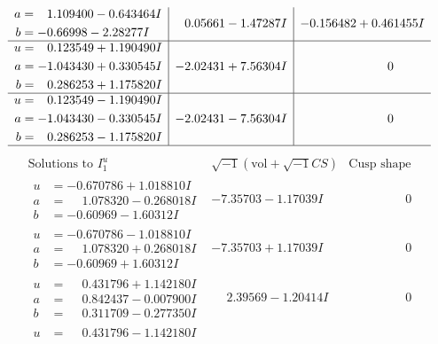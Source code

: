 \documentclass[1p]{elsarticle_modified}
\theoremstyle{definition}
\newcommand{\I}{\sqrt{-1}}
\begin{document}
$$\begin{array}{c|c|c}
\begin{aligned}
a &= \phantom{-}1.109400 - 0.643464 I \\
b &= -0.66998 - 2.28277 I\end{aligned}
 & \phantom{-}0.05661 - 1.47287 I & -0.156482 + 0.461455 I \\ \hline\begin{aligned}
u &= \phantom{-}0.123549 + 1.190490 I \\
a &= -1.043430 + 0.330545 I \\
b &= \phantom{-}0.286253 + 1.175820 I\end{aligned}
 & -2.02431 + 7.56304 I & \phantom{-0.000000 } 0 \\ \hline\begin{aligned}
u &= \phantom{-}0.123549 - 1.190490 I \\
a &= -1.043430 - 0.330545 I \\
b &= \phantom{-}0.286253 - 1.175820 I\end{aligned}
 & -2.02431 - 7.56304 I & \phantom{-0.000000 } 0\\
 \hline 
 \end{array}$$\newpage$$\begin{array}{c|c|c}  
\text{Solutions to }I^u_{1}& \I (\text{vol} + \sqrt{-1}CS) & \text{Cusp shape}\\
 \hline 
\begin{aligned}
u &= -0.670786 + 1.018810 I \\
a &= \phantom{-}1.078320 - 0.268018 I \\
b &= -0.60969 - 1.60312 I\end{aligned}
 & -7.35703 - 1.17039 I & \phantom{-0.000000 } 0 \\ \hline\begin{aligned}
u &= -0.670786 - 1.018810 I \\
a &= \phantom{-}1.078320 + 0.268018 I \\
b &= -0.60969 + 1.60312 I\end{aligned}
 & -7.35703 + 1.17039 I & \phantom{-0.000000 } 0 \\ \hline\begin{aligned}
u &= \phantom{-}0.431796 + 1.142180 I \\
a &= \phantom{-}0.842437 - 0.007900 I \\
b &= \phantom{-}0.311709 - 0.277350 I\end{aligned}
 & \phantom{-}2.39569 - 1.20414 I & \phantom{-0.000000 } 0 \\ \hline\begin{aligned}
u &= \phantom{-}0.431796 - 1.142180 I \\

\end{aligned}
\end{array}$$
\end{document}
